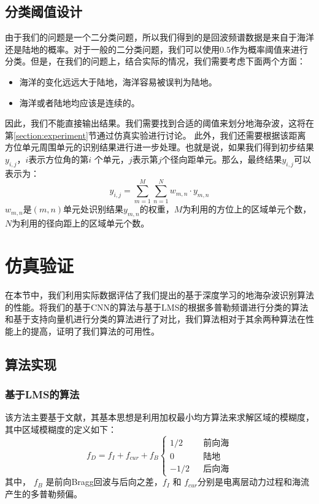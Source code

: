\subsection{分类阈值设计}
由于我们的问题是一个二分类问题，所以我们得到的是回波频谱数据是来自于海洋还是陆地的概率。对于一般的二分类问题，我们可以使用$ 0.5 $作为概率阈值来进行分类。但是，在我们的问题上，结合实际的情况，我们需要考虑下面两个方面：
\begin{itemize}
	\item 海洋的变化远远大于陆地，海洋容易被误判为陆地。
	\item 海洋或者陆地均应该是连续的。
\end{itemize}
因此，我们不能直接输出结果。我们需要找到合适的阈值来划分地海杂波，这将在第\ref{section:experiment}节通过仿真实验进行讨论。
此外，我们还需要根据该距离方位单元周围单元的识别结果进行进一步处理。也就是说，如果我们得到初步结果$y_{i,j}$，$i$表示方位角的第$ i $ 个单元，$ j $表示第$ j $个径向距单元。那么，最终结果$y_{i, j}$可以表示为：
\begin{equation}
y_{i, j} = \sum_{m=1}^{M}\sum_{n=1}^{N}w_{m,n}\cdot y_{m,n}
\end{equation}
$ w_{m,n} $是$(m,n)$单元处识别结果$y_{m,n}$的权重，$M$为利用的方位上的区域单元个数，$N$为利用的径向距上的区域单元个数。
\section{仿真验证}
在本节中，我们利用实际数据评估了我们提出的基于深度学习的地海杂波识别算法的性能。将我们的基于CNN的算法与基于LMS的根据多普勒频谱进行分类的算法和基于支持向量机进行分类的算法进行了对比，我们算法相对于其余两种算法在性能上的提高，证明了我们算法的可用性。
\subsection{算法实现}
\subsubsection{基于LMS的算法}
该方法主要基于文献\cite{turley2013high}，其基本思想是利用加权最小均方算法来求解区域的模糊度，其中区域模糊度的定义如下：
\begin{equation}
	f_D = f_I + f_{cur} + f_B\left\{
		\begin{array}{rcl}
		1/2       &      & \text{前向海}\\
		0     &      & \text{陆地}\\
		-1/2       &      & \text{后向海}
		\end{array} \right.
\end{equation}
其中， $f_B$ 是前向Bragg回波与后向之差，$f_I$ 和 $f_{cur}$分别是电离层动力过程和海流产生的多普勒频偏。

